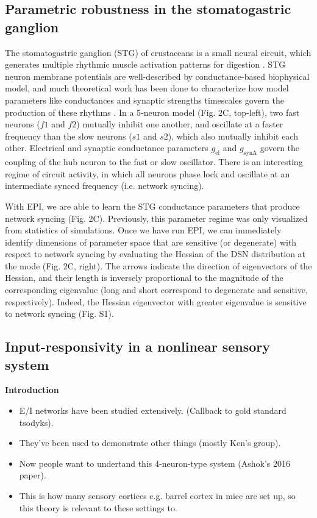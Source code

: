 \documentclass[11pt]{article}
\begin{document}
\subsection{Parametric robustness in the stomatogastric ganglion}
The stomatogastric ganglion (STG) of crustaceans is a small neural circuit, which generates multiple rhythmic muscle activation patterns for digestion \cite{marder}. STG neuron membrane potentials are well-described by conductance-based biophysical model, and much theoretical work has been done to characterize how model parameters like conductances and synaptic strengths timescales govern the production of these rhythms \cite{more marder}.  In a 5-neuron model \cite{gutierrez2013multiple} (Fig. 2C, top-left),  two fast neurons ($f1$ and $f2$) mutually inhibit one another, and oscillate at a faster frequency than the slow neurons ($s1$ and $s2$), which also mutually inhibit each other.  Electrical and synaptic conductance parameters $g_{\text{el}}$ and $g_{\text{synA}}$ govern the coupling of the hub neuron to the fast or slow oscillator.  There is an interesting regime of circuit activity, in which all neurons phase lock and oscillate at an intermediate synced frequency (i.e. network syncing). 

With EPI, we are able to learn the STG conductance parameters that produce network syncing (Fig. 2C). Previously, this parameter regime was only visualized from statistics of simulations. Once we have run EPI, we can immediately identify dimensions of parameter space that are sensitive (or degenerate) with respect to network syncing by evaluating the Hessian of the DSN distribution at the mode (Fig. 2C, right).  The arrows indicate the direction of eigenvectors of the Hessian, and their length is inversely proportional to the magnitude of the corresponding eigenvalue (long and short correspond to degenerate and sensitive, respectively).  Indeed, the Hessian eigenvector with greater eigenvalue is sensitive to network syncing (Fig. S1).

\subsection{Input-responsivity in a nonlinear sensory system}
\textbf{Introduction}
\begin{itemize}
\item E/I networks have been studied extensively. (Callback to gold standard tsodyks).
\item They've been used to demonstrate other things (mostly Ken's group).
\item Now people want to undertand this 4-neuron-type system (Ashok's 2016 paper).  
\item This is how many sensory cortices e.g. barrel cortex in mice are set up, so this theory is relevant to these settings to.
\end{itemize}
\end{document}
